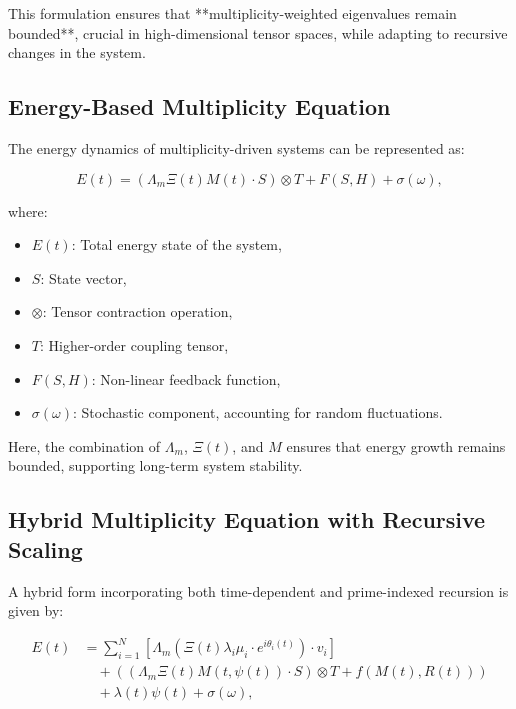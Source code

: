 \documentclass[12pt]{article}
\theoremstyle{plain}
\begin{document}
This formulation ensures that **multiplicity-weighted eigenvalues remain bounded**, crucial in high-dimensional tensor spaces, while adapting to recursive changes in the system.

\subsection{Energy-Based Multiplicity Equation}

The energy dynamics of multiplicity-driven systems can be represented as:

\begin{equation}
E(t) = (\Lambda_m \Xi(t) M(t) \cdot S) \otimes T + F(S, H) + \sigma(\omega),
\end{equation}

where:
\begin{itemize}
    \item \( E(t) \): Total energy state of the system,
    \item \( S \): State vector,
    \item \( \otimes \): Tensor contraction operation,
    \item \( T \): Higher-order coupling tensor,
    \item \( F(S, H) \): Non-linear feedback function,
    \item \( \sigma(\omega) \): Stochastic component, accounting for random fluctuations.
\end{itemize}

Here, the combination of \(\Lambda_m\), \(\Xi(t)\), and \(M\) ensures that energy growth remains bounded, supporting long-term system stability.

\subsection{Hybrid Multiplicity Equation with Recursive Scaling}

A hybrid form incorporating both time-dependent and prime-indexed recursion is given by:

\begin{align}
E(t) &= \sum_{i=1}^N \left[ \Lambda_m \left( \Xi(t) \lambda_i \mu_i \cdot e^{i\theta_i(t)} \right) \cdot v_i \right] \nonumber \\
&\quad + \left( (\Lambda_m \Xi(t) M(t, \psi(t)) \cdot S) \otimes T + f(M(t), R(t)) \right) \nonumber \\
&\quad + \lambda(t)\psi(t) + \sigma(\omega),
\end{align}
\end{document}
